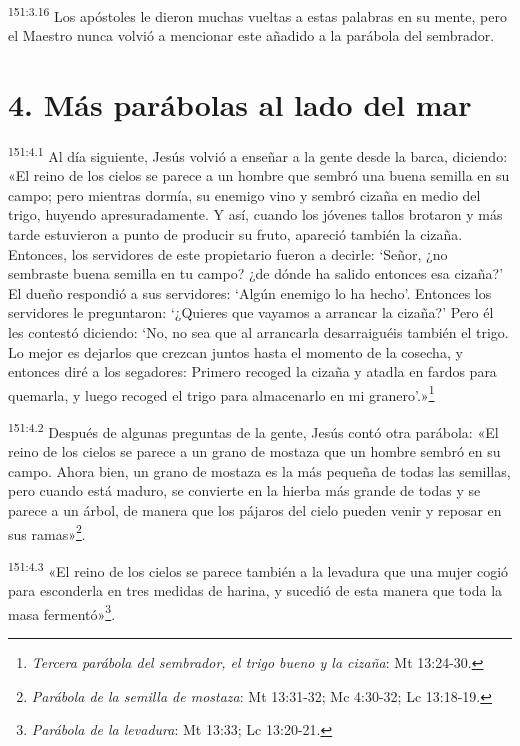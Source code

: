 \par
\textsuperscript{151:3.16} Los apóstoles le dieron muchas vueltas a estas palabras en su mente, pero el Maestro nunca volvió a mencionar este añadido a la parábola del sembrador.

\section*{4. Más parábolas al lado del mar}
\par
\textsuperscript{151:4.1} Al día siguiente, Jesús volvió a enseñar a la gente desde la barca, diciendo: «El reino de los cielos se parece a un hombre que sembró una buena semilla en su campo; pero mientras dormía, su enemigo vino y sembró cizaña en medio del trigo, huyendo apresuradamente. Y así, cuando los jóvenes tallos brotaron y más tarde estuvieron a punto de producir su fruto, apareció también la cizaña. Entonces, los servidores de este propietario fueron a decirle: `Señor, ¿no sembraste buena semilla en tu campo? ¿de dónde ha salido entonces esa cizaña?' El dueño respondió a sus servidores: `Algún enemigo lo ha hecho'. Entonces los servidores le preguntaron: `¿Quieres que vayamos a arrancar la cizaña?' Pero él les contestó diciendo: `No, no sea que al arrancarla desarraiguéis también el trigo. Lo mejor es dejarlos que crezcan juntos hasta el momento de la cosecha, y entonces diré a los segadores: Primero recoged la cizaña y atadla en fardos para quemarla, y luego recoged el trigo para almacenarlo en mi granero'.»\footnote{\textit{Tercera parábola del sembrador, el trigo bueno y la cizaña}: Mt 13:24-30.}

\par
\textsuperscript{151:4.2} Después de algunas preguntas de la gente, Jesús contó otra parábola: «El reino de los cielos se parece a un grano de mostaza que un hombre sembró en su campo. Ahora bien, un grano de mostaza es la más pequeña de todas las semillas, pero cuando está maduro, se convierte en la hierba más grande de todas y se parece a un árbol, de manera que los pájaros del cielo pueden venir y reposar en sus ramas»\footnote{\textit{Parábola de la semilla de mostaza}: Mt 13:31-32; Mc 4:30-32; Lc 13:18-19.}.

\par
\textsuperscript{151:4.3} «El reino de los cielos se parece también a la levadura que una mujer cogió para esconderla en tres medidas de harina, y sucedió de esta manera que toda la masa fermentó»\footnote{\textit{Parábola de la levadura}: Mt 13:33; Lc 13:20-21.}.

